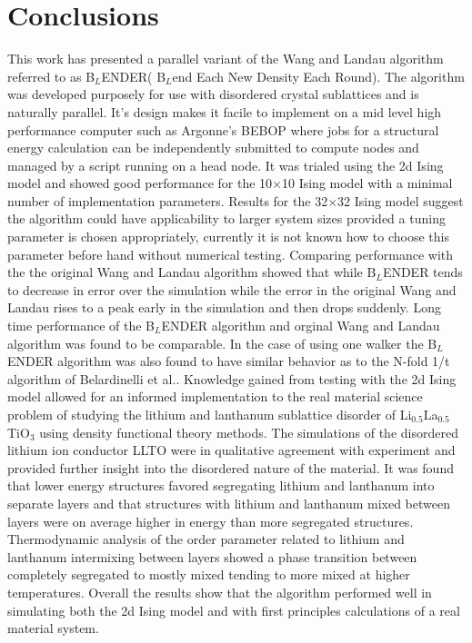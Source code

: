 \documentclass[aps,pre,reprint,superscriptaddress,showkeys]{revtex4-1}
\begin{document}
\section{Conclusions}
\label{sec4}
 This work has presented a parallel variant of the Wang and Landau algorithm referred to as B$_L$ENDER( B$_L$end Each New Density Each Round). The algorithm was developed purposely for use with disordered crystal sublattices and is naturally parallel. It's design makes it facile to implement on a mid level high performance computer such as Argonne's BEBOP where jobs for a structural energy calculation can be independently submitted to compute nodes  and managed by a script running on a head node. It was trialed using the 2d Ising model and showed good performance for the 10$\times$10 Ising model with a minimal number of implementation parameters. Results for the 32$\times$32 Ising model suggest the algorithm could have applicability to larger system sizes provided a tuning parameter is chosen appropriately, currently it is not known how to choose this parameter before hand without numerical testing. Comparing performance with the the original Wang and Landau algorithm showed that while B$_L$ENDER tends to decrease in error over the simulation while the error in the original Wang and Landau rises to a peak early in the simulation and then drops suddenly. Long time performance of the B$_L$ENDER algorithm and orginal Wang and Landau algorithm was found to be comparable.  In the case of using one walker the B$_L$ENDER algorithm was also found to have similar behavior as to the N-fold 1/t algorithm of Belardinelli et al.\cite{saturation}. Knowledge gained from testing with the 2d Ising model allowed for an informed implementation to the real material science problem of studying the lithium and lanthanum sublattice disorder of Li$_{0.5}$La$_{0.5}$TiO$_{3}$ using density functional theory methods. The simulations of the disordered lithium ion conductor LLTO were in qualitative agreement with experiment and provided further insight into the disordered nature of the material. It was found that lower energy structures favored segregating lithium and lanthanum into separate layers and that structures with lithium and lanthanum mixed between layers were on average higher in energy than more segregated structures. Thermodynamic analysis of the order parameter related to lithium and lanthanum intermixing between layers showed a phase transition between completely segregated  to mostly mixed tending to more mixed at higher temperatures. Overall the results show that the algorithm performed well in simulating both the 2d Ising model and with first principles calculations of a real material system. 
\end{document}
